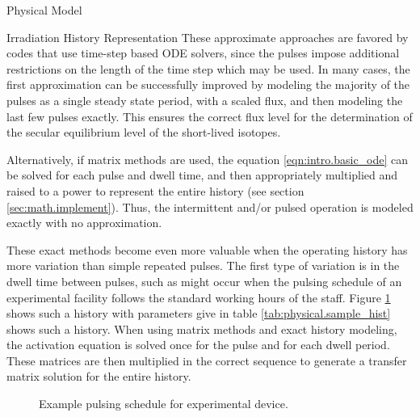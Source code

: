 \begin{chapter}{Physical Model\label{chap:physical}}
\begin{section}{Irradiation History Representation\label{sec:physical.pulsing}}
  These approximate approaches are favored by codes that use time-step
  based ODE solvers, since the pulses impose additional restrictions
  on the length of the time step which may be used.  In many cases,
  the first approximation can be successfully improved by modeling the
  majority of the pulses as a single steady state period, with a
  scaled flux, and then modeling the last few pulses exactly.  This
  ensures the correct flux level for the determination of the secular
  equilibrium level of the short-lived isotopes.
  
  Alternatively, if matrix methods are used, the equation
  \ref{eqn:intro.basic_ode} can be solved for each pulse and dwell
  time, and then appropriately multiplied and raised to a power to
  represent the entire history (see section \ref{sec:math.implement}).
  Thus, the intermittent and/or pulsed operation is modeled exactly
  with no approximation\cite{spanglerMS,spangler}.
  
  These exact methods become even more valuable when the operating
  history has more variation than simple repeated pulses.  The first
  type of variation is in the dwell time between pulses, such as might
  occur when the pulsing schedule of an experimental facility follows
  the standard working hours of the staff.  Figure
  \ref{fig:physical.sample_hist} shows such a history with parameters
  give in table \ref{tab:physical.sample_hist} shows such a history.
  When using matrix methods and exact history modeling, the activation
  equation is solved once for the pulse and for each dwell period.
  These matrices are then multiplied in the correct sequence to
  generate a transfer matrix solution for the entire history.

  \begin{figure}[htbp]
    \begin{center}
      \leavevmode
      \caption{Example pulsing schedule for experimental device.}
      \label{fig:physical.sample_hist}
    \end{center}
  \end{figure}


\end{section}
\end{chapter}
